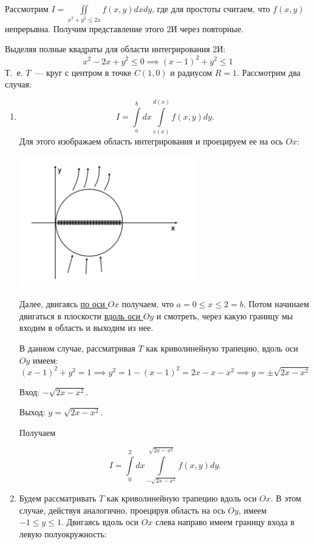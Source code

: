 \documentclass[../../main.tex]{subfiles}
\begin{document}
\begin{exmp}
	Рассмотрим $\displaystyle
	I = \iint\limits_{x^2 + y^2 \leq 2x} 
	f \left(x, y \right) dxdy $, 
	где для простоты считаем, что $ f \left( x, y \right) $ непрерывна. 
	Получим представление этого 2И через повторные.
	
	Выделяя полные квадраты для области интегрирования 2И:
	\[
	x^2 -2x + y^2 \leq 0 \implies (x-1)^2 + y^2 \leq 1
	\]
	Т.~е. $T$~--- круг с центром в точке $C \left( 1, 0 
	\right)$ и радиусом $R = 1$.
	Рассмотрим два случая:
	\begin{enumerate}
		\item   \[ I = \int\limits_a^b dx \int\limits_{c \left( x \right) } ^ 
		 {d \left( x \right) } f \left( x, y \right) dy. \]
		 Для этого изображаем область интегрирования и проецируем ее на ось $ Ox $:
		 
		 \begin{center}
		 	\includegraphics[width=0.6\textwidth]{lec13_circle_case1.png}
		 \end{center}
		 
		 Далее, двигаясь \underline{по оси $ Ox $} получаем, что 
		 $a = 0 \leq x \leq 2 = b$.
		 Потом начинаем двигаться в плоскости 
		 \underline{вдоль оси $ Oy $} и смотреть,
		 через какую границу мы входим в область и выходим из нее.
		 
		 В данном случае, рассматривая
		 $ T $ как криволинейную трапецию, вдоль оси $ Oy $ имеем:
		 \[ \left( x - 1\right)^2 + y^2 = 1 \implies 
		 y^2 = 1 - \left( x - 1 \right)^2 = 
		 2x - x - x^2 \implies y = \pm \sqrt{ 2x - x^2 } \]
		 
		 Вход: $ -\sqrt{2x - x^2 }$.
		 
		 Выход: $ y = \sqrt{2x - x^2 } $.
		 
		 Получаем
		 
		 \[ I = \int\limits_0^2 dx \int\limits_{-\sqrt{2x - x^2}} ^ 
		 {\sqrt{2x - x^2}} f \left( x, y\right) dy. \]
		\item Будем рассматривать $ T $ как криволинейную трапецию вдоль оси $ Ox $.
		В этом случае, действуя аналогично, проецируя область на ось $ Oy $, имеем 
		$ -1 \leq y \leq 1$. Двигаясь вдоль оси $ Ox $ слева направо 
		имеем границу входа в левую полуокружность:
		

\end{enumerate}
\end{exmp}
\end{document}
